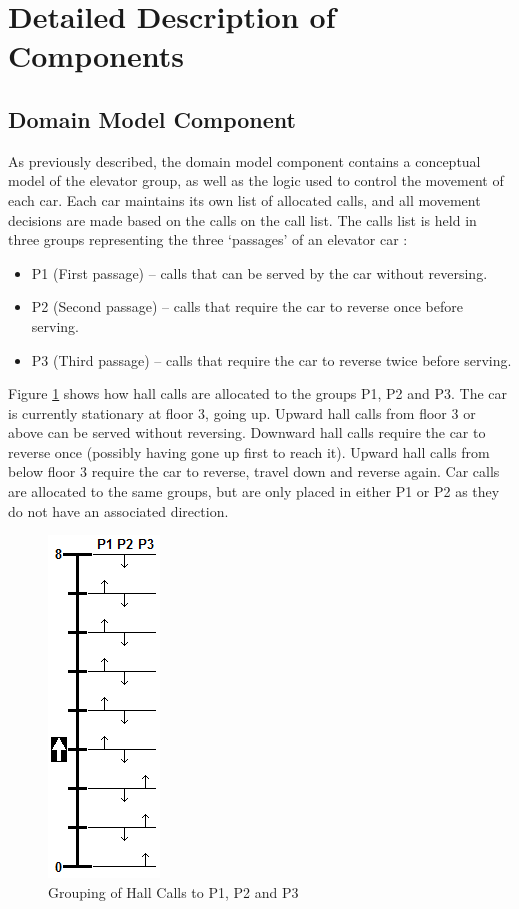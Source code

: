 \documentclass{UoYCSproject}
\begin{document}
\section{Detailed Description of Components}

\subsection{Domain Model Component}

As previously described, the domain model component contains a conceptual model of the elevator group, as well as the logic used to control the movement of each car.  Each car maintains its own list of allocated calls, and all movement decisions are made based on the calls on the call list.  The calls list is held in three groups representing the three `passages' of an elevator car \citep{Gagov2001,Rong2003}:
\begin{itemize}
	\item P1 (First passage) -- calls that can be served by the car without reversing.
	\item P2 (Second passage) -- calls that require the car to reverse once before serving.
	\item P3 (Third passage) -- calls that require the car to reverse twice before serving.
\end{itemize}

Figure \ref{p1p2p3} shows how hall calls are allocated to the groups P1, P2 and P3.  The car is currently stationary at floor 3, going up.  Upward hall calls from floor 3 or above can be served without reversing.  Downward hall calls require the car to reverse once (possibly having gone up first to reach it).  Upward hall calls from below floor 3 require the car to reverse, travel down and reverse again.  Car calls are allocated to the same groups, but are only placed in either P1 or P2 as they do not have an associated direction.

\begin{figure} [h]
	\centering
	\includegraphics{P1_P2_P3_illustration.png}
	\caption{Grouping of Hall Calls to P1, P2 and P3}
	\label{p1p2p3}
\end{figure}
\end{document}
